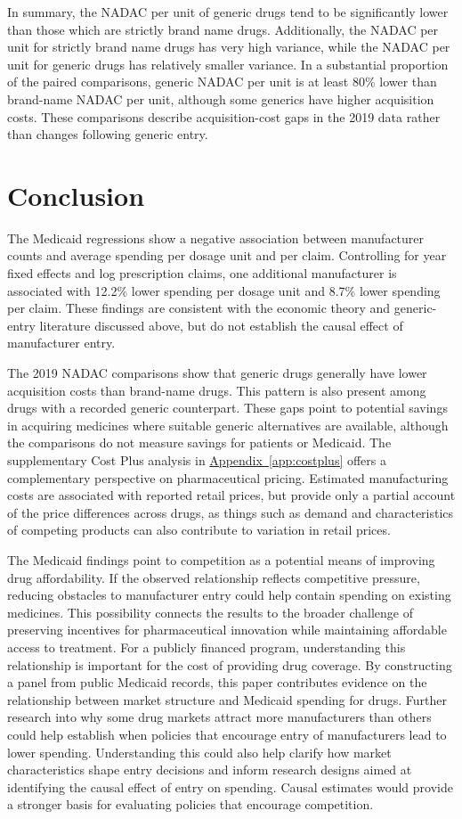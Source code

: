 \documentclass[12pt]{article}
\begin{document}
In summary, the NADAC per unit of generic drugs tend to be significantly lower than those which are strictly brand name drugs. Additionally, the NADAC per unit for strictly brand name drugs has very high variance, while the NADAC per unit for generic drugs has relatively smaller variance. In a substantial proportion of the paired comparisons, generic NADAC per unit is at least 80\% lower than brand-name NADAC per unit, although some generics have higher acquisition costs. These comparisons describe acquisition-cost gaps in the 2019 data rather than changes following generic entry.

\section{Conclusion}
The Medicaid regressions show a negative association between manufacturer counts and average spending per dosage unit and per claim. Controlling for year fixed effects and log prescription claims, one additional manufacturer is associated with 12.2\% lower spending per dosage unit and 8.7\% lower spending per claim. These findings are consistent with the economic theory and generic-entry literature discussed above, but do not establish the causal effect of manufacturer entry.

The 2019 NADAC comparisons show that generic drugs generally have lower acquisition costs than brand-name drugs. This pattern is also present among drugs with a recorded generic counterpart. These gaps point to potential savings in acquiring medicines where suitable generic alternatives are available, although the comparisons do not measure savings for patients or Medicaid. The supplementary Cost Plus analysis in \hyperref[app:costplus]{Appendix~\ref*{app:costplus}} offers a complementary perspective on pharmaceutical pricing. Estimated manufacturing costs are associated with reported retail prices, but provide only a partial account of the price differences across drugs, as things such as demand and characteristics of competing products can also contribute to variation in retail prices.

The Medicaid findings point to competition as a potential means of improving drug affordability. If the observed relationship reflects competitive pressure, reducing obstacles to manufacturer entry could help contain spending on existing medicines. This possibility connects the results to the broader challenge of preserving incentives for pharmaceutical innovation while maintaining affordable access to treatment. For a publicly financed program, understanding this relationship is important for the cost of providing drug coverage. By constructing a panel from public Medicaid records, this paper contributes evidence on the relationship between market structure and Medicaid spending for drugs. Further research into why some drug markets attract more manufacturers than others could help establish when policies that encourage entry of manufacturers lead to lower spending. Understanding this could also help clarify how market characteristics shape entry decisions and inform research designs aimed at identifying the causal effect of entry on spending. Causal estimates would provide a stronger basis for evaluating policies that encourage competition.
\end{document}
